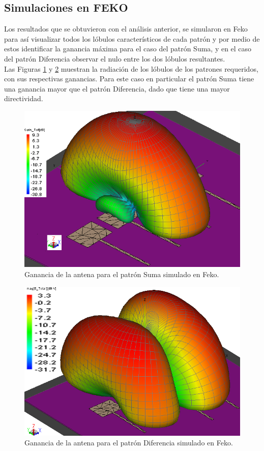 \documentclass[twocolumn]{IEEEtran}
\begin{document}
\subsection{Simulaciones en FEKO}
\noindent
Los resultados que se obtuvieron con el análisis anterior, se simularon en Feko para así visualizar todos los lóbulos característicos de cada patrón y por medio de estos identificar la ganancia máxima para el caso del patrón Suma, y en el caso del patrón Diferencia observar el nulo entre los dos lóbulos resultantes.\\
Las Figuras \ref{fig10} y \ref{fig11} muestran la radiación de los lóbulos de los patrones requeridos, con sus respectivas ganancias. Para este caso en particular el patrón Suma tiene una ganancia mayor que el patrón Diferencia, dado que tiene una mayor directividad.
\begin{figure}[H]
	\centering
		\includegraphics[scale=0.5]{sumafeko.png}
	\caption{Ganancia de la antena para el patrón Suma simulado en Feko.}
	\label{fig10}
\end{figure}
\begin{figure}[H]
	\centering
		\includegraphics[scale=0.5]{restafeko.png}
	\caption{Ganancia de la antena para el patrón Diferencia simulado en Feko.}
	\label{fig11}
\end{figure}
\end{document}
